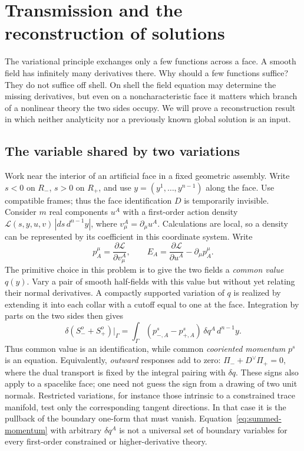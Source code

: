 \chapter{Transmission and the reconstruction of solutions}\label{ch:07}
The variational principle exchanges only a few functions across a face. A smooth field has infinitely many derivatives there. Why should a few functions suffice? They do not suffice off shell. On shell the field equation may determine the missing derivatives, but even on a noncharacteristic face it matters which branch of a nonlinear theory the two sides occupy. We will prove a reconstruction result in which neither analyticity nor a previously known global solution is an input.

\section{The variable shared by two variations}
Work near the interior of an artificial face in a fixed geometric assembly. Write $s<0$ on $R_-$, $s>0$ on $R_+$, and use $y=(y^1,\ldots,y^{n-1})$ along the face. Use compatible frames; thus the face identification $D$ is temporarily invisible. Consider $m$ real components $u^A$ with a first-order action density $\mathcal L(s,y,u,v)\,|ds\,d^{n-1}y|$, where $v^A_\mu=\partial_\mu u^A$. Calculations are local, so a density can be represented by its coefficient in this coordinate system. Write
\begin{equation}
 p_A^\mu=\frac{\partial\mathcal L}{\partial v^A_\mu},\qquad E_A=\frac{\partial\mathcal L}{\partial u^A}-\partial_\mu p_A^\mu .\label{eq:normal-momentum}
\end{equation}
The primitive choice in this problem is to give the two fields a \emph{common value} $q(y)$. Vary a pair of smooth half-fields with this value but without yet relating their normal derivatives. A compactly supported variation of $q$ is realized by extending it into each collar with a cutoff equal to one at the face. Integration by parts on the two sides then gives
\begin{equation}
 \delta(S_-^o+S_+^o)\big|_\Gamma
   =\int_\Gamma (p_{-,A}^s-p_{+,A}^s)\,\delta q^A\,d^{n-1}y .\label{eq:summed-momentum}
\end{equation}
Thus common value is an identification, while common \emph{cooriented momentum} $p^s$ is an equation. Equivalently, \emph{outward} responses add to zero: $\Pi_-+D^\vee\Pi_+=0$, where the dual transport is fixed by the integral pairing with $\delta q$. These signs also apply to a spacelike face; one need not guess the sign from a drawing of two unit normals. Restricted variations, for instance those intrinsic to a constrained trace manifold, test only the corresponding tangent directions. In that case it is the pullback of the boundary one-form that must vanish. Equation~\eqref{eq:summed-momentum} with arbitrary $\delta q^A$ is not a universal set of boundary variables for every first-order constrained or higher-derivative theory.


